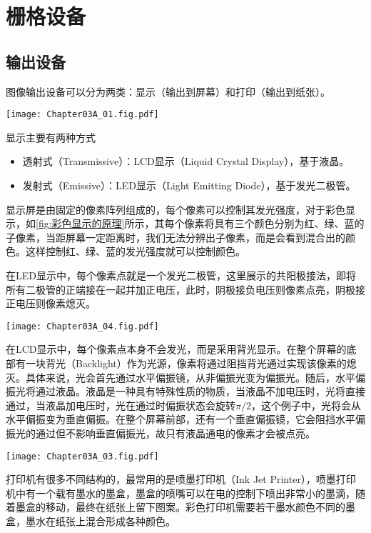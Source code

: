 \section{栅格设备}

\subsection{输出设备}

图像输出设备可以分为两类：显示（输出到屏幕）和打印（输出到纸张）。
\begin{Figure}[彩色显示的原理]
    \texttt{[image: Chapter03A\_01.fig.pdf]}
\end{Figure}

显示主要有两种方式
\begin{itemize}
    \item 透射式（Transmissive）：LCD显示（Liquid Crystal Display），基于液晶。
    \item 发射式（Emissive）：LED显示（Light Emitting Diode），基于发光二极管。
\end{itemize}
显示屏是由固定的像素阵列组成的，每个像素可以控制其发光强度，对于彩色显示，如\cref{fig:彩色显示的原理}所示，其每个像素将具有三个颜色分别为红、绿、蓝的子像素，当距屏幕一定距离时，我们无法分辨出子像素，而是会看到混合出的颜色。这样控制红、绿、蓝的发光强度就可以控制颜色。

在LED显示中，每个像素点就是一个发光二极管，这里展示的共阳极接法，即将所有二极管的正端接在一起并加正电压，此时，阴极接负电压则像素点亮，阴极接正电压则像素熄灭。
\begin{Figure}[LED显示]
    \texttt{[image: Chapter03A\_04.fig.pdf]}
\end{Figure}

在LCD显示中，每个像素点本身不会发光，而是采用背光显示。在整个屏幕的底部有一块背光（Backlight）作为光源，像素将通过阻挡背光通过实现该像素的熄灭。具体来说，光会首先通过水平偏振镜，从非偏振光变为偏振光。随后，水平偏振光将通过液晶。液晶是一种具有特殊性质的物质，当液晶不加电压时，光将直接通过，当液晶加电压时，光在通过时偏振状态会旋转$\pi/2$，这个例子中，光将会从水平偏振变为垂直偏振。在整个屏幕前部，还有一个垂直偏振镜，它会阻挡水平偏振光的通过但不影响垂直偏振光，故只有液晶通电的像素才会被点亮。
\begin{Figure}[LCD显示]
    \texttt{[image: Chapter03A\_03.fig.pdf]}
\end{Figure}

打印机有很多不同结构的，最常用的是喷墨打印机（Ink Jet Printer），喷墨打印机中有一个载有墨水的墨盒，墨盒的喷嘴可以在电的控制下喷出非常小的墨滴，随着墨盒的移动，最终在纸张上留下图案。彩色打印机需要若干墨水颜色不同的墨盒，墨水在纸张上混合形成各种颜色。


